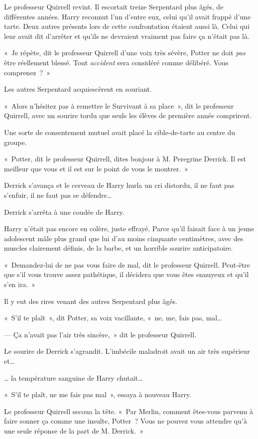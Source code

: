Le professeur Quirrell revint.
Il escortait treize Serpentard plus âgés, de différentes années.
Harry reconnut l'un d'entre eux, celui qu'il avait frappé d'une tarte.
Deux autres présents lors de cette confrontation étaient aussi là.
Celui qui leur avait dit d'arrêter et qu'ils ne devraient vraiment pas faire ça n'était pas là.

«~Je répète, dit le professeur Quirrell d'une voix très sévère, Potter ne doit \emph{pas} être réellement blessé.
Tout \emph{accident} sera considéré comme délibéré.
Vous comprenez~?~»

Les autres Serpentard acquiescèrent en souriant.

«~Alors n'hésitez pas à remettre le Survivant à sa place~», dit le professeur Quirrell, avec un sourire tordu que seuls les élèves de première année comprirent.

Une sorte de consentement mutuel avait placé la cible-de-tarte au centre du groupe.

«~Potter, dit le professeur Quirrell, dites bonjour à M. Peregrine Derrick.
Il est meilleur que vous et il est sur le point de vous le montrer.~»

Derrick s'avança et le cerveau de Harry hurla un cri distordu, il ne faut pas s'enfuir, il ne faut pas se défendre…

Derrick s'arrêta à une coudée de Harry.

Harry n'était pas encore en colère, juste effrayé.
Parce qu'il faisait face à un jeune adolescent mâle plus grand que lui d'au moins cinquante centimètres, avec des muscles clairement définis, de la barbe, et un horrible sourire anticipatoire.

«~Demandez-lui de ne pas vous faire de mal, dit le professeur Quirrell.
Peut-être que s'il vous trouve assez pathétique, il décidera que vous êtes ennuyeux et qu'il s'en ira.~»

Il y eut des rires venant des autres Serpentard plus âgés.

«~S'il te plaît~», dit Potter, sa voix vacillante, «~ne, me, fais pas, mal…

--- Ça n'avait pas l'air très sincère,~» dit le professeur Quirrell.

Le sourire de Derrick s'agrandit.
L'imbécile maladroit avait un air très supérieur et…

… la température sanguine de Harry chutait…

«~S'il te plaît, ne me fais pas mal~», essaya à nouveau Harry.

Le professeur Quirrell secoua la tête.
«~Par Merlin, comment êtes-vous parvenu à faire sonner ça comme une insulte, Potter~?
Vous ne pouvez vous attendre qu'à une seule réponse de la part de M. Derrick.~»

